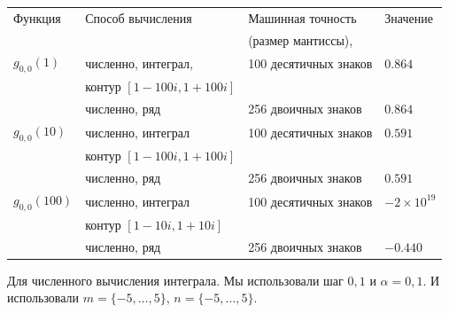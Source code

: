 \documentclass[12pt, a4paper]{report}
\begin{document}
\begin{tabular}{ l l l l }
\hline
    Функция        & Способ вычисления                              & Машинная точность                     & Значение                  \\ 
                   &                                                & (размер мантиссы),                    &                           \\
\hline%
    $g_{0,0}(1)$   & численно, интеграл,                            & 100 десятичных знаков                 & $ 0.864$                  \\
	           & контур $[1-100i, 1+100i]$                      &                                       &                           \\

	           & численно, ряд                                  & 256 двоичных знаков                   & $ 0.864$                  \\

    $g_{0,0}(10)$  & численно, интеграл                             & 100 десятичных знаков                 & $ 0.591$                  \\
                   & контур $[1-100i, 1+100i]$                      &                                       &                           \\

                   & численно, ряд                                  & 256 двоичных знаков                   & $ 0.591$                  \\

    $g_{0,0}(100)$ & численно, интеграл                             & 100 десятичных знаков                 & $-2 \times 10^{19}$       \\
	           & контур $[1-10i, 1+10i]$                        &                                       &                           \\
		   
                   & численно, ряд                                  & 256 двоичных знаков                   & $-0.440$                  \\
\hline
\end{tabular}

\bigskip

Для численного вычисления интеграла. Мы использовали шаг $0{,}1$ и $\alpha = 0{,}1$. И использовали $m=\{-5, \dots, 5\}$, $n=\{-5, \dots, 5\}$.
\end{document}
